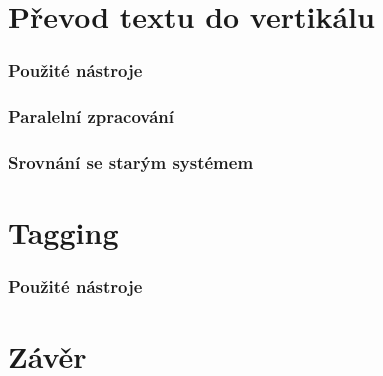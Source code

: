 \chapter{Převod textu do vertikálu} %
\subsection{Použité nástroje}
\subsection{Paralelní zpracování}
\label{vertikalizator}
\subsection{Srovnání se starým systémem}
\chapter{Tagging} %
\subsection{Použité nástroje}
\chapter{Závěr}
